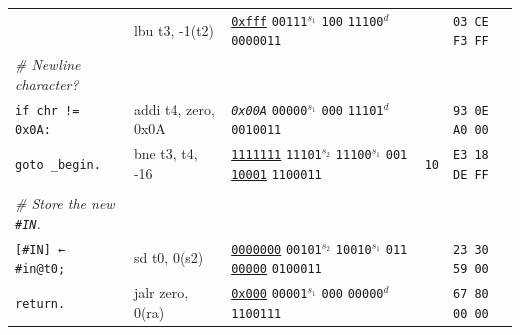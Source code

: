 \documentclass[a4paper,12pt,final]{article}
\begin{document}
\begin{table}[!htbp]
\begin{adjustwidth}{-1cm}{-1cm}
\begin{center}
\begin{tabular}{l|ll|l|l}
\hspace{1em} & lbu t3, -1(t2) & \uline{\texttt{0xfff}}                    \texttt{00111}​\(^{s_{1}}\) \texttt{100} \texttt{11100}​\(^{d}\)  \texttt{0000011} &  & \texttt{03 CE F3 FF}\\[0pt]
\hspace{1em} \emph{\# Newline character?} &  &  &  & \\[0pt]
\hspace{1em} \texttt{if chr != 0x0A:} & addi t4, zero, 0x0A & \emph{\texttt{0x00A}}                    \texttt{00000}​\(^{s_{1}}\) \texttt{000} \texttt{11101}​\(^{d}\)  \texttt{0010011} &  & \texttt{93 0E A0 00}\\[0pt]
\hspace{2em}   \texttt{goto \_begin.} & bne t3, t4, -16 & \uline{\texttt{1111111}} \texttt{11101}​\(^{s_{2}}\) \texttt{11100}​\(^{s_{1}}\) \texttt{001} \uline{\texttt{10001}} \texttt{1100011} & \texttt{10} & \texttt{E3 18 DE FF}\\[0pt]
\hspace{1em} &  &  &  & \\[0pt]
\hspace{1em} \emph{\# Store the new \texttt{\#IN}.} &  &  &  & \\[0pt]
\hspace{1em} \texttt{[\#IN] ← \#in@t0;} & sd t0, 0(s2) & \uline{\texttt{0000000}} \texttt{00101}​\(^{s_{2}}\) \texttt{10010}​\(^{s_{1}}\) \texttt{011} \uline{\texttt{00000}} \texttt{0100011} &  & \texttt{23 30 59 00}\\[0pt]
\hspace{1em} \texttt{return.} & jalr zero, 0(ra) & \uline{\texttt{0x000}}                    \texttt{00001}​\(^{s_{1}}\) \texttt{000} \texttt{00000}​\(^{d}\)  \texttt{1100111} &  & \texttt{67 80 00 00}\\[0pt]
\end{tabular}

\end{center}
\normalsize \end{adjustwidth} \end{table} \vspace{0}
\end{document}
